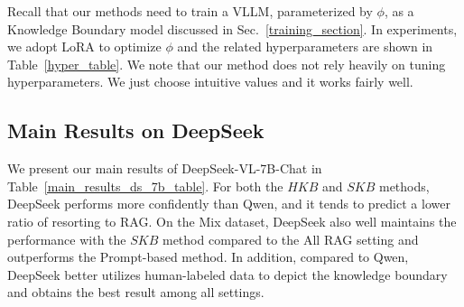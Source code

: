 Recall that our methods need to train a VLLM, parameterized by $\phi$, as a Knowledge Boundary model discussed in Sec.~\ref{training_section}. In experiments, we adopt LoRA \cite{hu2021lora} to optimize $\phi$ and the related hyperparameters are shown in Table~\ref{hyper_table}. We note that our method does not rely heavily on tuning hyperparameters. We just choose intuitive values and it works fairly well. 




\subsection{Main Results on DeepSeek}
\label{main_results_ds_section}

We present our main results of DeepSeek-VL-7B-Chat in Table~\ref{main_results_ds_7b_table}. For both the $HKB$ and $SKB$ methods, DeepSeek performs more confidently than Qwen, and it tends to predict a lower ratio of resorting to RAG. On the Mix dataset, DeepSeek also well maintains the performance with the $SKB$ method compared to the All RAG setting and outperforms the Prompt-based method. In addition, compared to Qwen, DeepSeek better utilizes human-labeled data to depict the knowledge boundary and obtains the best result among all settings.

